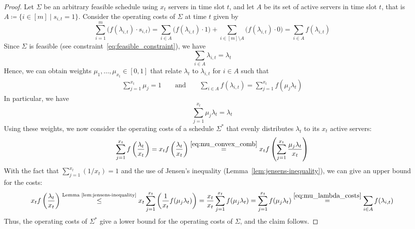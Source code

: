 \begin{proof}
Let $\Sigma$ be an arbitrary feasible schedule using $x_t$ servers in time slot $t$, and let $A$ be its set of active servers in time slot $t$, that is $A\coloneqq\{i\in[m]\mid s_{i,t}=1\}$.
Consider the operating costs of $\Sigma$ at time $t$ given by
\begin{equation*}
	\sum\limits_{i=1}^{m}\bigl(f(\lambda_{i,t})\cdot s_{i,t}\bigr)=\sum\limits_{i\in A}\bigl(f(\lambda_{i,t})\cdot1\bigr)+\sum\limits_{i\in [m]\setminus A}\bigl(f(\lambda_{i,t})\cdot0\bigr)=\sum\limits_{i\in A}f(\lambda_{i,t})
\end{equation*}
Since $\Sigma$ is feasible (see constraint~\eqref{eq:feasible_constraint}), we have 
\begin{equation*}
	\sum\limits_{i\in A}\lambda_{i,t}=\lambda_t
\end{equation*}
Hence, we can obtain weights $\mu_1,\dotsc,\mu_{x_t}\in[0,1]$ that relate $\lambda_t$ to $\lambda_{i,t}$ for $i\in A$ such that
\begin{align}
	\sum\limits_{j=1}^{x_t}\mu_j=1\qquad\text{and}\qquad \sum\limits_{i\in A}f(\lambda_{i,t})=\sum\limits_{j=1}^{x_t}f(\mu_j\lambda_t)\label{eq:mu_lambda_costs}
\end{align}
In particular, we have 
\begin{equation}
	\sum_{j=1}^{x_t}\mu_j\lambda_t=\lambda_t\label{eq:mu_convex_comb}
\end{equation}
Using these weights, we now consider the operating costs of a schedule $\Sigma^*$ that evenly distributes $\lambda_t$ to its $x_t$ active servers:
\begin{align*}
	\sum\limits_{j=1}^{x_t}f\left(\frac{\lambda_t}{x_t}\right)=x_tf\left(\frac{\lambda_t}{x_t}\right)\stackrel{\eqref{eq:mu_convex_comb}}{=}x_tf\left(\sum\limits_{j=1}^{x_t}{\frac{\mu_j\lambda_t}{x_t}}\right)
\end{align*}
With the fact that $\sum_{j=1}^{x_t}(1/x_t)=1$ and the use of Jensen's inequality (Lemma~\ref{lem:jensens-inequality}), we can give an upper bound for the costs:
\begin{align*}
	x_tf\left(\frac{\lambda_t}{x_t}\right)\stackrel{\text{Lemma~\ref{lem:jensens-inequality}}}{\le}x_t\sum\limits_{j=1}^{x_t}\left(\frac{1}{x_t}f(\mu_j\lambda_t)\right)=\frac{x_t}{x_t}\sum\limits_{j=1}^{x_t}f(\mu_j\lambda_t)=\sum\limits_{j=1}^{x_t}f(\mu_j\lambda_t)\stackrel{\eqref{eq:mu_lambda_costs}}{=}\sum\limits_{i\in A}f(\lambda_{i,t})
\end{align*}
Thus, the operating costs of $\Sigma^*$ give a lower bound for the operating costs of $\Sigma$, and the claim follows.
\end{proof}
